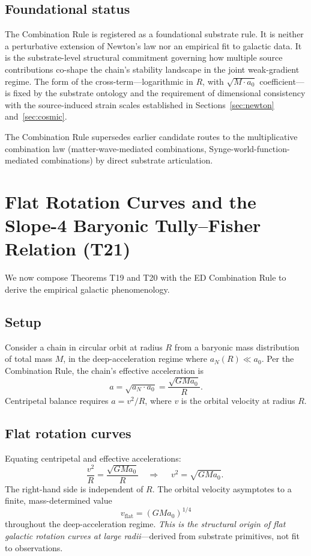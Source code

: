 \documentclass[11pt,a4paper]{article}
\begin{document}
\subsection{Foundational status}

The Combination Rule is registered as a foundational substrate rule. It is neither a perturbative extension of Newton's law nor an empirical fit to galactic data. It is the substrate-level structural commitment governing how multiple source contributions co-shape the chain's stability landscape in the joint weak-gradient regime. The form of the cross-term---logarithmic in $R$, with $\sqrt{M\cdot a_0}$ coefficient---is fixed by the substrate ontology and the requirement of dimensional consistency with the source-induced strain scales established in Sections~\ref{sec:newton} and~\ref{sec:cosmic}.

The Combination Rule supersedes earlier candidate routes to the multiplicative combination law (matter-wave-mediated combinations, Synge-world-function-mediated combinations) by direct substrate articulation.

\section{Flat Rotation Curves and the Slope-4 Baryonic Tully--Fisher Relation (T21)}\label{sec:btfr}

We now compose Theorems T19 and T20 with the ED Combination Rule to derive the empirical galactic phenomenology.

\subsection{Setup}

Consider a chain in circular orbit at radius $R$ from a baryonic mass distribution of total mass $M$, in the deep-acceleration regime where $a_N(R) \ll a_0$. Per the Combination Rule, the chain's effective acceleration is
\begin{equation}
a = \sqrt{a_N \cdot a_0} = \frac{\sqrt{G M a_0}}{R}.
\end{equation}
Centripetal balance requires $a = v^2/R$, where $v$ is the orbital velocity at radius $R$.

\subsection{Flat rotation curves}

Equating centripetal and effective accelerations:
\begin{equation}
\frac{v^2}{R} = \frac{\sqrt{G M a_0}}{R}
\quad\Longrightarrow\quad
\boxed{\;v^2 = \sqrt{G M a_0}.\;}
\end{equation}
The right-hand side is independent of $R$. The orbital velocity asymptotes to a finite, mass-determined value
\begin{equation}
v_{\mathrm{flat}} = (G M a_0)^{1/4}
\end{equation}
throughout the deep-acceleration regime. \emph{This is the structural origin of flat galactic rotation curves at large radii}---derived from substrate primitives, not fit to observations.
\end{document}

